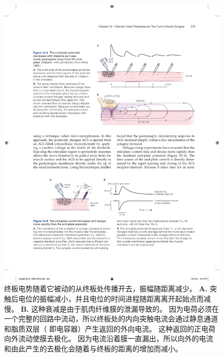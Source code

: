 \begin{figure}[htbp]
	\centering
	\includegraphics[width=0.8\linewidth]{chap12/fig_12_5}
	\caption{终板电势随着它被动的从终板处传播开去，振幅随距离减少。
		\textbf{A.} 突触后电位的振幅减小，并且电位的时间进程随距离离开起始点而减慢。
		\textbf{B.} 这种衰减是由于肌肉纤维膜的泄漏导致的。
		因为电荷必须在一个完整的回路中流动，所以终板处的内向突触电流会通过静息通道和脂质双层（ 即电容器）产生返回的外向电流。 
		这种返回的正电荷向外流动使膜去极化。 
		因为电流沿着膜一直漏出，所以向外的电流和由此产生的去极化会随着与终板的距离的增加而减小。}
	\label{fig:12_5}
\end{figure}


